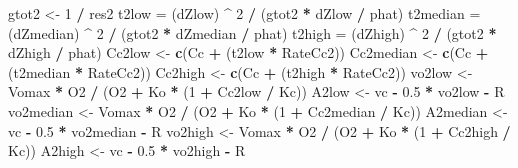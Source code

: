 \documentclass[
]{krantz}
\makeatletter
\newenvironment{Shaded}{\begin{snugshade}}{\end{snugshade}}
\newcommand{\DecValTok}[1]{\textcolor[rgb]{0.00,0.00,0.81}{#1}}
\newcommand{\FloatTok}[1]{\textcolor[rgb]{0.00,0.00,0.81}{#1}}
\newcommand{\KeywordTok}[1]{\textcolor[rgb]{0.13,0.29,0.53}{\textbf{#1}}}
\newcommand{\NormalTok}[1]{#1}
\newcommand{\OperatorTok}[1]{\textcolor[rgb]{0.81,0.36,0.00}{\textbf{#1}}}
\newcommand{\StringTok}[1]{\textcolor[rgb]{0.31,0.60,0.02}{#1}}
\newenvironment{kframe}{%
\medskip{}
\setlength{\fboxsep}{.8em}
 \def\at@end@of@kframe{}%
 \ifinner\ifhmode%
  \def\at@end@of@kframe{\end{minipage}}%
  \begin{minipage}{\columnwidth}%
 \fi\fi%
 \def\FrameCommand##1{\hskip\@totalleftmargin \hskip-\fboxsep
 \colorbox{shadecolor}{##1}\hskip-\fboxsep
     \hskip-\linewidth \hskip-\@totalleftmargin \hskip\columnwidth}%
 \MakeFramed {\advance\hsize-\width
   \@totalleftmargin\z@ \linewidth\hsize
   \@setminipage}}%
 {\par\unskip\endMakeFramed%
 \at@end@of@kframe}
\renewenvironment{Shaded}{\begin{kframe}}{\end{kframe}}
\makeatother
\begin{document}
\begin{Shaded}
\begin{Highlighting}[]
\NormalTok{gtot2 \textless{}{-}}\StringTok{ }\DecValTok{1} \OperatorTok{/}\StringTok{ }\NormalTok{res2}
\NormalTok{t2low =}\StringTok{ }\NormalTok{(dZlow) }\OperatorTok{\^{}}\StringTok{ }\DecValTok{2} \OperatorTok{/}\StringTok{ }\NormalTok{(gtot2 }\OperatorTok{*}\StringTok{ }\NormalTok{dZlow }\OperatorTok{/}\StringTok{ }\NormalTok{phat)}
\NormalTok{t2median =}\StringTok{ }\NormalTok{(dZmedian) }\OperatorTok{\^{}}\StringTok{ }\DecValTok{2} \OperatorTok{/}\StringTok{ }\NormalTok{(gtot2 }\OperatorTok{*}\StringTok{ }\NormalTok{dZmedian }\OperatorTok{/}\StringTok{ }\NormalTok{phat)}
\NormalTok{t2high =}\StringTok{ }\NormalTok{(dZhigh) }\OperatorTok{\^{}}\StringTok{ }\DecValTok{2} \OperatorTok{/}\StringTok{ }\NormalTok{(gtot2 }\OperatorTok{*}\StringTok{ }\NormalTok{dZhigh }\OperatorTok{/}\StringTok{ }\NormalTok{phat)}
\NormalTok{Cc2low \textless{}{-}}\StringTok{ }\KeywordTok{c}\NormalTok{(Cc }\OperatorTok{+}\StringTok{ }\NormalTok{(t2low }\OperatorTok{*}\StringTok{ }\NormalTok{RateCc2))}
\NormalTok{Cc2median \textless{}{-}}\StringTok{ }\KeywordTok{c}\NormalTok{(Cc }\OperatorTok{+}\StringTok{ }\NormalTok{(t2median }\OperatorTok{*}\StringTok{ }\NormalTok{RateCc2))}
\NormalTok{Cc2high \textless{}{-}}\StringTok{ }\KeywordTok{c}\NormalTok{(Cc }\OperatorTok{+}\StringTok{ }\NormalTok{(t2high }\OperatorTok{*}\StringTok{ }\NormalTok{RateCc2))}
\NormalTok{vo2low \textless{}{-}}\StringTok{ }\NormalTok{Vomax }\OperatorTok{*}\StringTok{ }\NormalTok{O2 }\OperatorTok{/}\StringTok{ }\NormalTok{(O2 }\OperatorTok{+}\StringTok{ }\NormalTok{Ko }\OperatorTok{*}\StringTok{ }\NormalTok{(}\DecValTok{1} \OperatorTok{+}\StringTok{ }\NormalTok{Cc2low }\OperatorTok{/}\StringTok{ }\NormalTok{Kc)) }
\NormalTok{A2low \textless{}{-}}\StringTok{ }\NormalTok{vc }\OperatorTok{{-}}\StringTok{ }\FloatTok{0.5} \OperatorTok{*}\StringTok{ }\NormalTok{vo2low }\OperatorTok{{-}}\StringTok{ }\NormalTok{R }
\NormalTok{vo2median \textless{}{-}}\StringTok{ }\NormalTok{Vomax }\OperatorTok{*}\StringTok{ }\NormalTok{O2 }\OperatorTok{/}\StringTok{ }\NormalTok{(O2 }\OperatorTok{+}\StringTok{ }\NormalTok{Ko }\OperatorTok{*}\StringTok{ }\NormalTok{(}\DecValTok{1} \OperatorTok{+}\StringTok{ }\NormalTok{Cc2median }\OperatorTok{/}\StringTok{ }\NormalTok{Kc)) }
\NormalTok{A2median \textless{}{-}}\StringTok{ }\NormalTok{vc }\OperatorTok{{-}}\StringTok{ }\FloatTok{0.5} \OperatorTok{*}\StringTok{ }\NormalTok{vo2median }\OperatorTok{{-}}\StringTok{ }\NormalTok{R }
\NormalTok{vo2high \textless{}{-}}\StringTok{ }\NormalTok{Vomax }\OperatorTok{*}\StringTok{ }\NormalTok{O2 }\OperatorTok{/}\StringTok{ }\NormalTok{(O2 }\OperatorTok{+}\StringTok{ }\NormalTok{Ko }\OperatorTok{*}\StringTok{ }\NormalTok{(}\DecValTok{1} \OperatorTok{+}\StringTok{ }\NormalTok{Cc2high }\OperatorTok{/}\StringTok{ }\NormalTok{Kc)) }
\NormalTok{A2high \textless{}{-}}\StringTok{ }\NormalTok{vc }\OperatorTok{{-}}\StringTok{ }\FloatTok{0.5} \OperatorTok{*}\StringTok{ }\NormalTok{vo2high }\OperatorTok{{-}}\StringTok{ }\NormalTok{R }


\end{Highlighting}
\end{Shaded}
\end{document}
